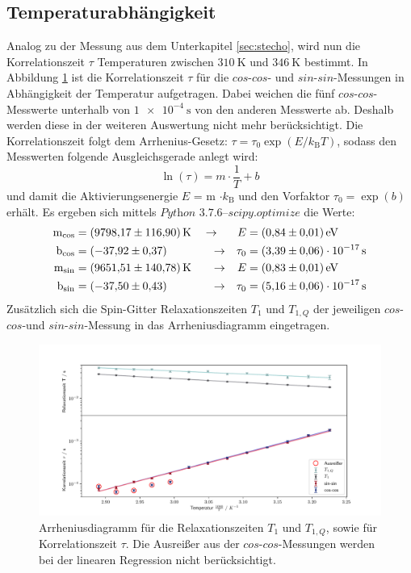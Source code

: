 \subsection{Temperaturabhängigkeit}
\label{sec:tempabh}
Analog zu der Messung aus dem Unterkapitel \ref{sec:stecho}, wird nun die
Korrelationszeit $\tau$ Temperaturen zwischen $\SI{310}{\kelvin}$
und $\SI{346}{\kelvin}$ bestimmt. In Abbildung \ref{fig:tempabh}
ist die Korrelationszeit $\tau$ für die $cos$-$cos$- und $sin$-$sin$-Messungen
in Abhängigkeit der Temperatur aufgetragen. Dabei weichen die fünf
$cos$-$cos$-Messwerte unterhalb von $\SI{1e-4}{\second}$ von den anderen Messwerte
ab. Deshalb werden diese in der weiteren Auswertung nicht mehr berücksichtigt.
Die Korrelationszeit folgt
dem Arrhenius-Gesetz: $\tau = \tau_0 \exp{(E/k_{\text{B}}T)}$, sodass den Messwerten
folgende Ausgleichsgerade anlegt wird:
\begin{equation*}
  \ln{(\tau)} = m \cdot \frac{1}{T} + b
\end{equation*}
\noindent
und damit die Aktivierungsenergie $E$ = m $\cdot k_{\text{B}}$ und den Vorfaktor
$\tau_0 = \exp{(b)}$ erhält. Es ergeben sich mittels
$\textit{Python 3.7.6--scipy.optimize}$ die Werte:
\begin{align*}
  \text{m}_{\text{cos}} &= \SI{9798,17\pm116,90}{\kelvin}
  \quad\rightarrow
  &E &= \SI{0.84\pm0.01}{\electronvolt} \\
  \text{b}_{\text{cos}} &= \SI{-37,92\pm0,37}
  \qquad\quad\,\;\;\rightarrow
  &\tau_0 &= \SI{3,39\pm0,06 e-17}{\second} \\
  \text{m}_{\text{sin}} &= \SI{9651,51\pm140,78}{\kelvin}
  \,\;\;\quad\rightarrow
  &E &= \SI{0.83\pm0.01}{\electronvolt} \\
  \text{b}_{\text{sin}} &= \SI{-37,50\pm0.43}
  \qquad\quad\,\;\;\rightarrow
  &\tau_0 &= \SI{5,16\pm0,06 e-17}{\second}
\end{align*}
\noindent
Zusätzlich sich die Spin-Gitter Relaxationszeiten $T_1$ und $T_{1,Q}$
der jeweiligen $cos$-$cos$-und $sin$-$sin$-Messung in das Arrheniusdiagramm eingetragen.

\begin{figure}[H]
    \centering
    \includegraphics[width=\textwidth]{Auswertung/Tempabh/Korr_Temp.pdf}
    \caption{Arrheniusdiagramm für die Relaxationszeiten $T_1$ und $T_{1,Q}$, sowie
    für Korrelationszeit $\tau$. Die Ausreißer aus der $cos$-$cos$-Messungen werden
    bei der linearen Regression nicht berücksichtigt.}
    \label{fig:tempabh}
\end{figure}

